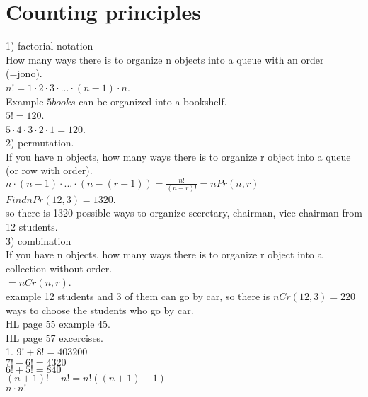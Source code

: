 \documentclass{article}
\begin{document}
  \section{Counting principles}
  1) factorial notation\\
  How many ways there is to organize n objects into a queue with an order (=jono).\\
  $n!=1\cdot2\cdot3\cdot...\cdot (n-1) \cdot n$.\\
  Example $5 books$ can be organized into a bookshelf.\\
  $5!=120$.\\
  $5\cdot4\cdot3\cdot2\cdot1=120$.\\
  2) permutation.\\
  If you have n objects, how many ways there is to organize r object into a queue (or row with order).\\
  $n\cdot (n-1)\cdot ...\cdot (n-(r-1))=\frac{n!}{(n-r)!}=nPr(n,r)$\\
  $Find nPr(12,3)=1320$.\\
  so there is 1320 possible ways to organize secretary, chairman, vice chairman from 12 students.\\
  3) combination\\
  If you have n objects, how many ways there is to organize r object into a collection without order.\\
  $=nCr(n,r)$.\\
  example 12 students and 3 of them can go by car, so there is $nCr(12,3)=220$ ways to choose the students who go by car.\\ 
  HL page 55 example 45.\\

  HL page 57 excercises.\\
  1. $9!+8!=403200$\\
  $7!-6!=4320$\\
  $6!+5!=840$\\
  $(n+1)!-n!=n!   ((n+1) -1)$\\
  $n\cdot n!$\\
  

   
\end{document}
